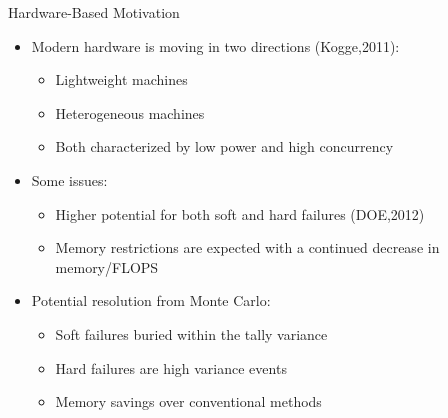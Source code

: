 \documentclass{beamer}
\begin{document}
\begin{frame}{Hardware-Based Motivation}

  \begin{itemize}
  \item Modern hardware is moving in two directions (Kogge,2011):
    \begin{itemize}
    \item Lightweight machines
    \item Heterogeneous machines
    \item Both characterized by low power and high concurrency
    \end{itemize}
    \medskip \medskip
  \item Some issues:
    \begin{itemize}
    \item Higher potential for both soft and hard failures (DOE,2012)
    \item Memory restrictions are expected with a continued decrease
      in memory/FLOPS
    \end{itemize}
    \medskip \medskip
  \item Potential resolution from Monte Carlo:
    \begin{itemize}
    \item Soft failures buried within the tally variance
    \item Hard failures are high variance events
    \item Memory savings over conventional methods
    \end{itemize}
  \end{itemize}

\end{frame}
\end{document}
